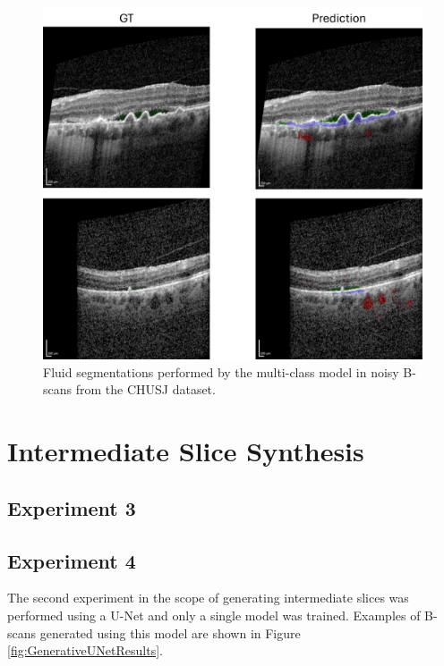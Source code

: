 \begin{figure}[!ht]
	\centering	\includegraphics[width=0.75\linewidth]{figures/CHUSJSegmentationOnNoisyScans.png}
	\caption{Fluid segmentations performed by the multi-class model in noisy B-scans from the CHUSJ dataset.}
	\label{fig:CHUSJSegmentationOnNoisyScans}
\end{figure}

\section{Intermediate Slice Synthesis}\label{IntermediateSliceSynthesis}

\subsection{Experiment 3}

\subsection{Experiment 4}

The second experiment in the scope of generating intermediate slices was performed using a U-Net and only a single model was trained. Examples of B-scans generated using this model are shown in Figure \ref{fig:GenerativeUNetResults}.

